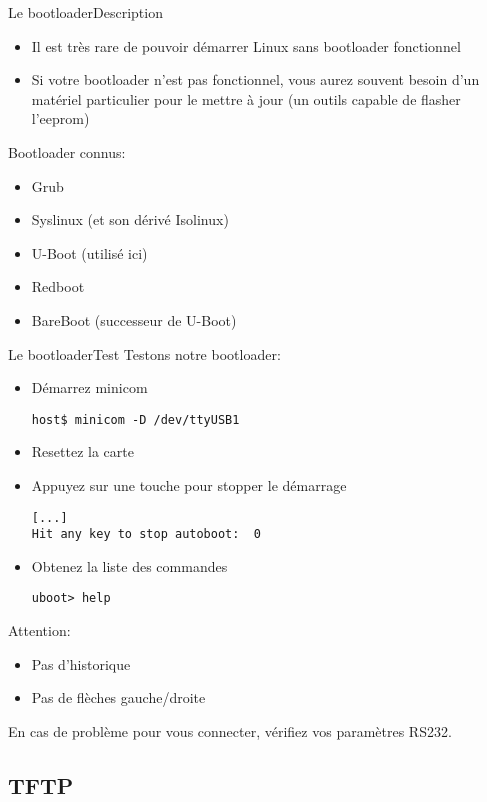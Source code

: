 \begin{frame}{Le bootloader}{Description}
  \begin{itemize}
    \item Il  est très  rare de pouvoir  démarrer Linux  sans bootloader
    fonctionnel
    \item Si votre bootloader  n'est pas fonctionnel, vous aurez souvent
    besoin d'un matériel particulier pour  le mettre à jour (un outils
    capable de flasher l'eeprom)
  \end{itemize}
  Bootloader connus:
  \begin{itemize}
    \item Grub
    \item Syslinux (et son dérivé Isolinux)
    \item U-Boot (utilisé ici)
    \item Redboot
    \item BareBoot (successeur de U-Boot)
  \end{itemize}
\end{frame}

\begin{frame}[fragile=singleslide]{Le bootloader}{Test}
  Testons notre bootloader:
  \begin{itemize}
    \item Démarrez minicom
    \begin{lstlisting}
host$ minicom -D /dev/ttyUSB1
    \end{lstlisting}
  \item Resettez la carte
  \item Appuyez sur une touche pour stopper le démarrage
    \begin{lstlisting}
[...]
Hit any key to stop autoboot:  0
    \end{lstlisting}
  \item Obtenez la liste des commandes
    \begin{lstlisting}
uboot> help
    \end{lstlisting}
  \end{itemize}
  Attention:
  \begin{itemize}
  \item Pas d'historique
  \item Pas de flèches gauche/droite
  \end{itemize}
  En  cas de  problème pour  vous connecter,  vérifiez  vos paramètres
  RS232.
\end{frame}

\subsection{TFTP}

